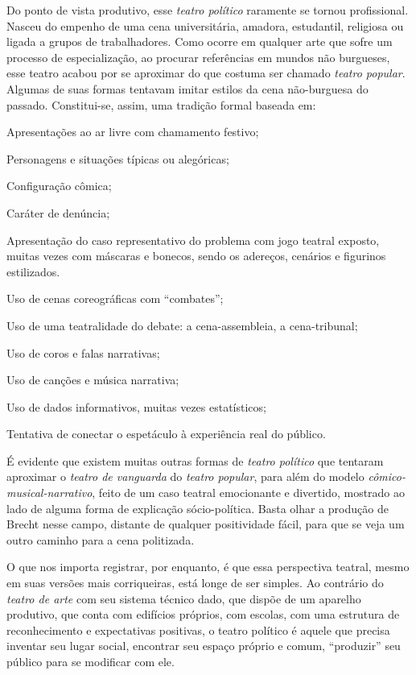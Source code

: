 Do ponto de vista produtivo, esse {\it teatro político} raramente se
tornou profissional. Nasceu do empenho de uma cena universitária,
amadora, estudantil, religiosa ou ligada a grupos de trabalhadores. Como
ocorre em qualquer arte que sofre um processo de especialização, ao
procurar referências em mundos não burgueses, esse teatro acabou por se
aproximar do que costuma ser chamado {\it teatro popular}. Algumas de
suas formas tentavam imitar estilos da cena não-burguesa do passado.
Constitui-se, assim, uma tradição formal baseada em:

\startitemize[a,packed]
\item
  Apresentações ao ar livre com chamamento festivo;
\item
  Personagens e situações típicas ou alegóricas;
\item
  Configuração cômica;
\item
  Caráter de denúncia;
\item
  Apresentação do caso representativo do problema com jogo teatral
  exposto, muitas vezes com máscaras e bonecos, sendo os adereços,
  cenários e figurinos estilizados.
\item
  Uso de cenas coreográficas com “combates”;
\item
  Uso de uma teatralidade do debate: a cena-assembleia, a cena-tribunal;
\item
  Uso de coros e falas narrativas;
\item
  Uso de canções e música narrativa;
\item
  Uso de dados informativos, muitas vezes estatísticos;
\item
  Tentativa de conectar o espetáculo à experiência real do público.
\stopitemize

É evidente que existem muitas outras formas de {\it teatro político} que
tentaram aproximar o {\it teatro de vanguarda} do {\it teatro popular},
para além do modelo {\it cômico-musical-narrativo}, feito de um caso
teatral emocionante e divertido, mostrado ao lado de alguma forma de
explicação sócio-política. Basta olhar a produção de Brecht nesse campo,
distante de qualquer positividade fácil, para que se veja um outro
caminho para a cena politizada.

O que nos importa registrar, por enquanto, é que essa perspectiva
teatral, mesmo em suas versões mais corriqueiras, está longe de ser
simples. Ao contrário do {\it teatro de arte} com seu sistema técnico
dado, que dispõe de um aparelho produtivo, que conta com edifícios
próprios, com escolas, com uma estrutura de reconhecimento e
expectativas positivas, o teatro político é aquele que precisa inventar
seu lugar social, encontrar seu espaço próprio e comum, “produzir” seu
público para se modificar com ele.

